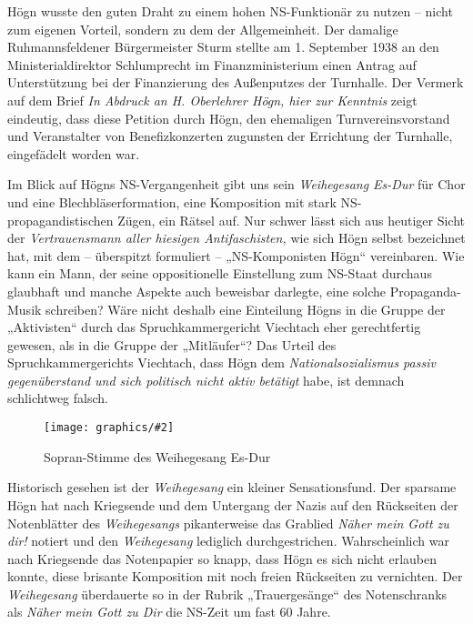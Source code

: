 \documentclass{book}
\newcommand{\img}[2][width=\linewidth]{\noindent\texttt{[image: graphics/\#2]}}
\begin{document}
Högn wusste den guten Draht zu einem hohen NS-Funktionär zu nutzen –
nicht zum eigenen Vorteil, sondern zu dem der Allgemeinheit. Der
damalige Ruhmannsfeldener Bürgermeister Sturm stellte am 1. September
1938 an den Ministerialdirektor Schlumprecht im Finanzministerium einen
Antrag auf Unterstützung bei der Finanzierung des Außenputzes der
Turnhalle. Der Vermerk auf dem Brief \textit{In Abdruck an H.
Oberlehrer Högn, hier zur Kenntnis} zeigt eindeutig, dass diese
Petition durch Högn, den ehemaligen Turnvereinsvorstand und
Veranstalter von Benefizkonzerten zugunsten der Errichtung der
Turnhalle, eingefädelt worden war.

Im Blick auf Högns NS-Vergangenheit gibt uns sein \textit{Weihegesang
Es-Dur} für Chor und eine Blechbläserformation, eine Komposition mit
stark NS-pro\-pa\-gan\-di\-sti\-schen Zügen, ein Rätsel auf. Nur schwer lässt
sich aus heutiger Sicht der \textit{Vertrauensmann aller hiesigen
Antifaschisten,} wie sich Högn selbst bezeichnet hat, mit dem –
überspitzt formuliert – „NS-Komponisten Högn“ vereinbaren. Wie kann ein
Mann, der seine oppositionelle Einstellung zum NS-Staat durchaus
glaubhaft und manche Aspekte auch beweisbar darlegte, eine solche
Propaganda-Musik schreiben? Wäre nicht deshalb eine Einteilung Högns
in die Gruppe der „Aktivisten“ durch das Spruchkammergericht Viechtach
eher gerechtfertig gewesen, als in die Gruppe der „Mitläufer“? Das
Urteil des Spruchkammergerichts Viechtach, dass Högn dem
\textit{Nationalsozialismus passiv gegenüberstand und sich politisch
nicht aktiv betätigt} habe, ist demnach schlichtweg falsch.

\begin{figure}
\img{Weihegesang}
\caption{Sopran-Stimme des Weihegesang Es-Dur}
\end{figure}

Historisch gesehen ist der \textit{Weihegesang} ein kleiner
Sensationsfund. Der sparsame Högn hat nach Kriegsende und dem Untergang
der Nazis auf den Rückseiten der Notenblätter des \textit{Weihegesangs}
pikanterweise das Grablied \textit{Näher mein Gott zu dir!} notiert und
den \textit{Weihegesang} lediglich durchgestrichen. Wahrscheinlich
war nach Kriegsende das Notenpapier so knapp, dass Högn es sich nicht
erlauben konnte, diese brisante Komposition mit noch freien Rückseiten
zu vernichten. Der \textit{Weihegesang} überdauerte so in der Rubrik
„Trauergesänge“ des Notenschranks als \textit{Näher mein Gott zu Dir}
die NS-Zeit um fast 60 Jahre.
\end{document}
